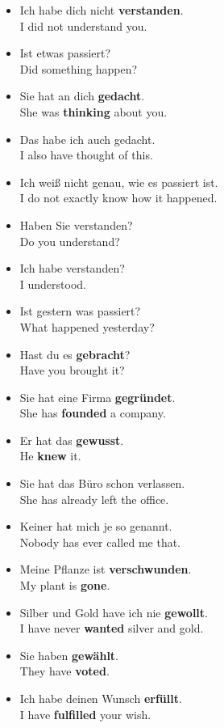 \begin{itemize}
  \item  Ich habe dich nicht \textbf{verstanden}. \\
  I did not understand you.
  \item  Ist etwas passiert? \\
  Did something happen?
  \item  Sie hat an dich \textbf{gedacht}. \\
  She was \textbf{thinking} about you.
  \item  Das habe ich auch gedacht. \\
  I also have thought of this.
  \item  Ich wei{\ss} nicht genau, wie es passiert ist. \\
  I do not exactly know how it happened.
  \item  Haben Sie verstanden? \\
  Do you understand?
  \item  Ich habe verstanden? \\
  I understood.
  \item  Ist gestern was passiert? \\
  What happened yesterday?
  \item  Hast du es \textbf{gebracht}? \\
  Have you brought it?
  \item  Sie hat eine Firma \textbf{gegr{\"u}ndet}. \\
  She has \textbf{founded} a company.
  \item  Er hat das \textbf{gewusst}. \\
  He \textbf{knew} it.
  \item  Sie hat das B{\"u}ro schon verlassen. \\
  She has already left the office.
  \item  Keiner hat mich je so genannt. \\
  Nobody has ever called me that.
  \item  Meine Pflanze ist \textbf{verschwunden}. \\
  My plant is \textbf{gone}.
  \item  Silber und Gold have ich nie \textbf{gewollt}. \\
  I have never \textbf{wanted} silver and gold.
  \item  Sie haben \textbf{gew{\"a}hlt}. \\
  They have \textbf{voted}.
  \item  Ich habe deinen Wunsch \textbf{erf{\"u}llt}. \\
  I have \textbf{fulfilled} your wish.
\end{itemize}


